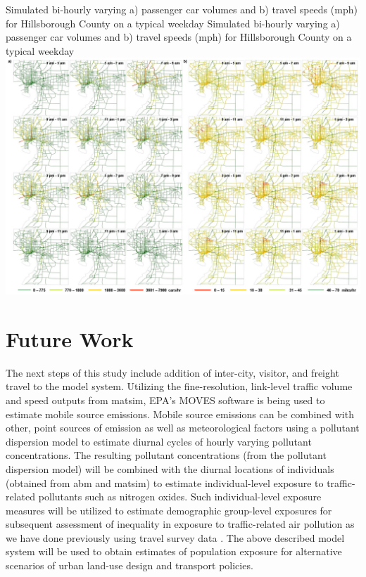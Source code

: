 \createfigure%
{Simulated bi-hourly varying a) passenger car volumes and b) travel speeds (mph) for Hillsborough County on a typical weekday}%
{Simulated bi-hourly varying a) passenger car volumes and b) travel speeds (mph) for Hillsborough County on a typical weekday}%
{\label{fig:tampa-fig3}}%
{\includegraphics[width=1.5\textwidth, angle=90]{./scenarios/figures/tampa-fig3.jpg}}%
{}

\section{Future Work}
The next steps of this study include addition of inter-city, visitor, and freight travel to the model system. 
Utilizing the fine-resolution, link-level traffic volume and speed outputs from \gls{matsim}, EPA’s MOVES software is being used to estimate mobile source emissions. 
Mobile source emissions can be combined with other, point sources of emission as well as meteorological factors using a pollutant dispersion model to estimate diurnal cycles of hourly varying pollutant concentrations. 
The resulting pollutant concentrations (from the pollutant dispersion model) will be combined with the diurnal locations of individuals (obtained from \gls{abm} and \gls{matsim}) to estimate individual-level exposure to traffic-related pollutants such as nitrogen oxides. 
Such individual-level exposure measures will be utilized to estimate demographic group-level exposures for subsequent assessment of inequality in exposure to traffic-related air pollution as we have done previously using travel survey data \citep[][]{GurramEtAl_AQAH_2015}. 
The above described model system will be used to obtain estimates of population exposure for alternative scenarios of urban land-use design and transport policies.

